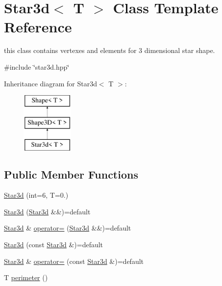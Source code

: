 \hypertarget{classStar3d}{}\section{Star3d$<$ T $>$ Class Template Reference}
\label{classStar3d}


this class contains vertexes and elements for 3 dimensional star shape.  




{\ttfamily \#include \char`\"{}star3d.\+hpp\char`\"{}}

Inheritance diagram for Star3d$<$ T $>$\+:\begin{figure}[H]
\begin{center}
\leavevmode
\includegraphics[height=3.000000cm]{classStar3d}
\end{center}
\end{figure}
\subsection*{Public Member Functions}
\begin{DoxyCompactItemize}
\item 
\mbox{\hyperlink{classStar3d_ad264da858df1ef77144a4cd7345185da}{Star3d}} (int=6, T=0.)
\item 
\mbox{\hyperlink{classStar3d_a6793481605da65706c5fc9ca1d4b82ad}{Star3d}} (\mbox{\hyperlink{classStar3d}{Star3d}} \&\&)=default
\item 
\mbox{\hyperlink{classStar3d}{Star3d}} \& \mbox{\hyperlink{classStar3d_a35ace37c66d10033bef1d0acaf9f3283}{operator=}} (\mbox{\hyperlink{classStar3d}{Star3d}} \&\&)=default
\item 
\mbox{\hyperlink{classStar3d_a5f4b217dd7926f73faaa57766546b022}{Star3d}} (const \mbox{\hyperlink{classStar3d}{Star3d}} \&)=default
\item 
\mbox{\hyperlink{classStar3d}{Star3d}} \& \mbox{\hyperlink{classStar3d_a6e1939003aedebc06efdb51404dfbadd}{operator=}} (const \mbox{\hyperlink{classStar3d}{Star3d}} \&)=default
\item 
T \mbox{\hyperlink{classStar3d_aac560f44b7b7d278781231fbaf8312e1}{perimeter}} ()
\end{DoxyCompactItemize}
